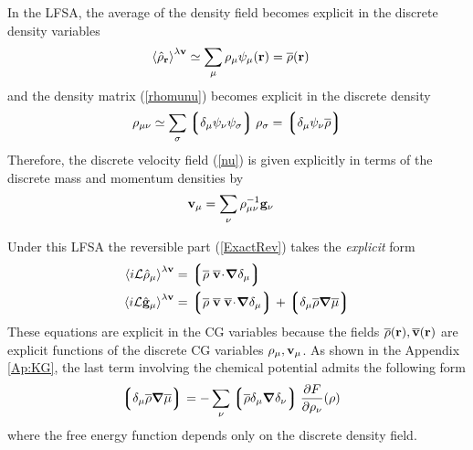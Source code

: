 \documentclass[b5paper,openright,11pt]{book}
\newcommand{\esc}{\!\cdot\!}
\newcommand{\llangle}{\left\langle}
\newcommand{\rrangle}{\right\rangle}
\newcommand{\llg}{\left\lgroup}
\newcommand{\rlg}{\right\rgroup}
\begin{document}
In the LFSA, the average of the density field becomes explicit
in the discrete density variables
\begin{align}
  \llangle \hat{\rho}_{\bf r}\rrangle^{\lambda{\bf v}}&\simeq
\sum_\mu\rho_\mu\psi_\mu({\bf r})=\overline{\rho}({\bf r})
\end{align}
and the density matrix (\ref{rhomunu}) becomes explicit in the discrete density 
\begin{align}
  \rho_{\mu\nu} \simeq \sum_\sigma\llg\delta_\mu\psi_\nu\psi_\sigma\rlg\rho_\sigma
=\llg\delta_\mu\psi_\nu\overline{\rho}\rlg
\label{calR1}
\end{align}
Therefore, the discrete velocity  field (\ref{nu}) is given explicitly
in terms of the discrete mass and momentum densities by
\begin{align}
{\bf v}_\mu&=\sum_\nu\rho^{-1}_{\mu\nu}{\bf g}_\nu
\label{un}
\end{align}

Under this  LFSA the reversible  part (\ref{ExactRev}) takes
the \textit{explicit} form
\begin{align}
  \llangle i{\cal L}  \hat{\rho}_{\mu}\rrangle^{\lambda{\bf v}}&= 
\llg \overline{\rho}\;\overline{\bf v}\esc\boldsymbol{\nabla}\delta_\mu\rlg
\nonumber\\
\llangle i{\cal L}  \hat{\bf g}_{\mu}\rrangle^{\lambda{\bf v}} &=
\llg\overline{\rho}\;\overline{\bf v}\;\overline{\bf v}\esc\boldsymbol{\nabla}\delta_{\mu}\rlg
+\llg\delta_\mu\overline{\rho}\boldsymbol{\nabla}\overline{\mu}\rlg
\label{RevDis}
\end{align}
These equations  are explicit in  the CG variables because  the fields
$\overline{\rho}({\bf  r}),\overline{\bf  v}({\bf  r})$  are  explicit
functions  of the  discrete CG  variables $\rho_\mu,{\bf  v}_\mu$.  As
shown  in  the  Appendix  \ref{Ap:KG}, the  last  term  involving  the
chemical potential admits the following form
\begin{align}
  \llg\delta_\mu\overline{\rho}\boldsymbol{\nabla}\overline{\mu}\rlg&=
-\sum_\nu\llg\overline{\rho}\delta_{\mu}\boldsymbol{\nabla}\delta_{\nu}\rlg
\frac{\partial  F}{\partial \rho_{\nu}}(\rho)
\end{align}
where the free energy function depends only on the discrete density field.
\end{document}
